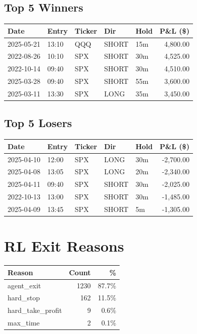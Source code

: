 \documentclass[11pt,a4paper,twoside]{article}
\begin{document}
\subsection*{Top 5 Winners}
\noindent\begin{center}
\begin{tabular}{>{\color{txtmain}}l llll r}
\toprule
\rowcolor{cardbg}
\textbf{Date} & \textbf{Entry} & \textbf{Ticker} & \textbf{Dir} & \textbf{Hold} & \textbf{P\&L (\$)} \\
\midrule
2025-05-21 & 13:10 & QQQ & SHORT & 15m & \textcolor{wingreen}{4,800.00} \\
2022-08-26 & 10:10 & SPX & SHORT & 30m & \textcolor{wingreen}{4,525.00} \\
2022-10-14 & 09:40 & SPX & SHORT & 30m & \textcolor{wingreen}{4,510.00} \\
2025-03-28 & 09:40 & SPX & SHORT & 55m & \textcolor{wingreen}{3,600.00} \\
2025-03-11 & 13:30 & SPX & LONG & 35m & \textcolor{wingreen}{3,450.00} \\
\bottomrule
\end{tabular}
\end{center}
\subsection*{Top 5 Losers}
\noindent\begin{center}
\begin{tabular}{>{\color{txtmain}}l llll r}
\toprule
\rowcolor{cardbg}
\textbf{Date} & \textbf{Entry} & \textbf{Ticker} & \textbf{Dir} & \textbf{Hold} & \textbf{P\&L (\$)} \\
\midrule
2025-04-10 & 12:00 & SPX & LONG & 30m & \textcolor{lossred}{-2,700.00} \\
2025-04-08 & 13:05 & SPX & LONG & 20m & \textcolor{lossred}{-2,340.00} \\
2025-04-11 & 09:40 & SPX & SHORT & 30m & \textcolor{lossred}{-2,025.00} \\
2022-10-13 & 13:00 & SPX & SHORT & 30m & \textcolor{lossred}{-1,485.00} \\
2025-04-09 & 13:45 & SPX & SHORT & 5m & \textcolor{lossred}{-1,305.00} \\
\bottomrule
\end{tabular}
\end{center}
\clearpage
\section*{RL Exit Reasons}
\noindent\begin{center}
\begin{tabular}{>{\color{txtmain}}l rr}
\toprule
\rowcolor{cardbg}
\textbf{Reason} & \textbf{Count} & \textbf{\%} \\
\midrule
agent\_exit & 1230 & 87.7\% \\
hard\_stop & 162 & 11.5\% \\
hard\_take\_profit & 9 & 0.6\% \\
max\_time & 2 & 0.1\% \\
\bottomrule
\end{tabular}
\end{center}
\end{document}
